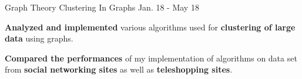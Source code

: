 \begin{cventries}
  \cventry
    {Graph Theory} %
    {Clustering In Graphs} %
    {} %
    {Jan. 18 - May 18} %
    {
      \begin{cvitems}
        \item{\textbf{Analyzed and implemented} various algorithms used for
         \textbf{clustering of large data} using graphs.}
        \item{\textbf{Compared the performances} of my implementation of
         algorithms on data set from \textbf{social networking sites} as well as \textbf{teleshopping sites}.}
      \end{cvitems}
    }

\end{cventries}
